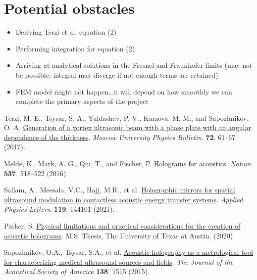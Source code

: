 \documentclass[12pt]{article}%
\begin{document}
\section*{Potential obstacles}

\begin{itemize}
    \item Deriving Terzi et al. equation (2)
    \item Performing integration for equation (2)
    \item Arriving at analytical solutions in the Fresnel and Fraunhofer limits (may not be possible; integral may diverge if not enough terms are retained)
    \item FEM model might not happen\dots it will depend on how smoothly we can complete the primary aspects of the project
\end{itemize}




\begin{thebibliography}{99}
Terzi, M. E., Tsysar, S. A., Yuldashev, P. V., Karzova, M. M., and Sapozhnikov, O. A. \href{https://doi.org/10.3103/S0027134916050180}{Generation of a vortex ultrasonic beam with a phase plate with an angular dependence of the thickness}. \textit{Moscow University Physics Bulletin}. \textbf{72}, 61–67 (2017).


Melde, K., Mark, A. G., Qiu, T., and Fischer, P. \href{https://doi.org/10.1038/nature19755}{Holograms for acoustics}. \textit{Nature}. \textbf{537}, 518–522 (2016).

Sallam, A., Meesala, V.C., Hajj, M.R., et al. \href{https://doi.org/10.1063/5.0065489}{Holographic mirrors for spatial ultrasound modulation in contactless acoustic energy transfer systems}.  \textit{Applied Physics Letters}. \textbf{119}, 144101 (2021).

Parker, S. \href{https://hdl.handle.net/2152/87049}{Physical limitations and practical considerations for the creation of acoustic holograms}. M.S. Thesis, The University of Texas at Austin. (2020).

Sapozhnikov, O.A., Tsysar, S.A., et al. \href{https://doi.org/10.1121/1.4928396}{Acoustic holography as a metrological tool for characterizing medical ultrasound sources and fields}. \textit{The Journal of the Acoustical Society of America} \textbf{138}, 1515 (2015). 


\end{thebibliography}
\end{document}
